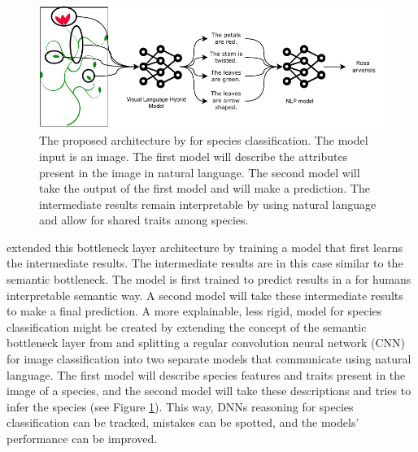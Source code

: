 \documentclass[a4paper, 12pt, oneside]{book} %
\begin{document}
\begin{figure} [tbp]
    \centering
    \vspace{0cm}
    \includegraphics[width=\textwidth]{figures/architecture_v2.pdf}
    \caption[Proposed architecture]{The proposed architecture by \textcite{ishikawa_contextual_2021} for species classification. The model input is an image. The first model will describe the attributes present in the image in natural language. The second model will take the output of the first model and will make a prediction. The intermediate results remain interpretable by using natural language and allow for shared traits among species.}
    \label{fig:intro}
\end{figure}

\textcite{ishikawa_contextual_2021} extended this bottleneck layer architecture by training a model that first learns the intermediate results.
The intermediate results are in this case similar to the semantic bottleneck.
The model is first trained to predict results in a for humans interpretable semantic way.
A second model will take these intermediate results to make a final prediction.
A more explainable, less rigid, model for species classification might be created by extending the concept of the semantic bottleneck layer from \textcite{ishikawa_contextual_2021} and splitting a regular convolution neural network (CNN) for image classification into two separate models that communicate using natural language.
The first model will describe species features and traits present in the image of a species, and the second model will take these descriptions and tries to infer the species (see Figure \ref{fig:intro}).
This way, DNNs reasoning for species classification can be tracked, mistakes can be spotted, and the models' performance can be improved.
\end{document}
